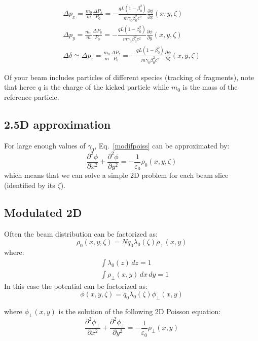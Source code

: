 \documentclass[a4paper,12pt]{report}
\begin{document}
\begin{align}
\Delta p_x = \frac{m_0}{m}\frac{\Delta P_x} {P_0}= -\frac{qL (1-\beta_0^2)}{ m\gamma_0\beta_0^2 c^2} \frac{\partial \phi}{\partial x}\left(x, y,\zeta\right)\label{dpx}\\
\Delta p_y = \frac{m_0}{m}\frac{\Delta P_y} {P_0}= -\frac{qL (1-\beta_0^2)}{ m\gamma_0\beta_0^2 c^2} \frac{\partial \phi}{\partial y}\left(x, y,\zeta\right)\label{dpy}\\
\Delta \delta \simeq \Delta p_z = \frac{m_0}{m}\frac{\Delta P_z} {P_0}= -\frac{qL (1-\beta_0^2)}{ m\gamma_0\beta_0^2 c^2} \frac{\partial \phi}{\partial \zeta}\left(x, y,\zeta\right)\label{dpz}
\end{align}

Of your beam includes particles of different species (tracking of fragments), note that heree $q$ is the charge of the kicked particle while $m_0$ is the mass of the reference particle.


\subsection{2.5D approximation}
For large enough values of $\gamma_0$, Eq.~\ref{modifpoiss} can be approximated by:
\begin{equation}
\frac{\partial^2 \phi}{\partial x^2} +  \frac{\partial^2 \phi}{\partial y^2} = -\frac{1}{\varepsilon_0}{\rho}_0 \left(x, y,\zeta\right) \label{2dpoiss}
\end{equation}
which means that we can solve a simple 2D problem for each beam slice (identified by its $\zeta$).


\subsection{Modulated 2D}

Often the beam distribution can be factorized as:
\begin{equation}
\rho_0(x,y,\zeta) = Nq_0\lambda_0(\zeta)\rho_\perp(x,y) 
\end{equation}
where:
\begin{align}
&\int \lambda_0(z) \,dz = 1\\
&\int \rho_\perp(x,y) \,dx\,dy = 1
\end{align}
In this case the potential can be factorized as:
\begin{equation}
\phi(x,y,\zeta) = q_0\lambda_0(\zeta)\phi_\perp(x,y) 
\end{equation}

where $\phi_\perp(x,y)$ is the solution of the following 2D Poisson equation:
\begin{equation}
\frac{\partial^2 \phi_\perp}{\partial x^2} +  \frac{\partial^2 \phi_\perp}{\partial y^2} = -\frac{1}{\varepsilon_0}{\rho}_\perp \left(x, y\right) \label{2dpoisspeerp}
\end{equation}
\end{document}
